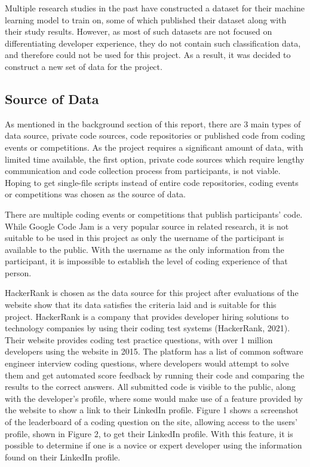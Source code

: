\documentclass{report}
\begin{document}
Multiple research studies in the past have constructed a dataset for their machine learning model to train on, some of which published their dataset along with their study results. However, as most of such datasets are not focused on differentiating developer experience, they do not contain such classification data, and therefore could not be used for this project. As a result, it was decided to construct a new set of data for the project.

\subsection{Source of Data}

As mentioned in the background section of this report, there are 3 main types of data source, private code sources, code repositories or published code from coding events or competitions. As the project requires a significant amount of data, with limited time available, the first option, private code sources which require lengthy communication and code collection process from participants, is not viable. Hoping to get single-file scripts instead of entire code repositories, coding events or competitions was chosen as the source of data.

There are multiple coding events or competitions that publish participants’ code. While Google Code Jam is a very popular source in related research, it is not suitable to be used in this project as only the username of the participant is available to the public. With the username as the only information from the participant, it is impossible to establish the level of coding experience of that person.

HackerRank is chosen as the data source for this project after evaluations of the website show that its data satisfies the criteria laid and is suitable for this project. HackerRank is a company that provides developer hiring solutions to technology companies by using their coding test systems (HackerRank, 2021). Their website provides coding test practice questions, with over 1 million developers using the website in 2015. The platform has a list of common software engineer interview coding questions, where developers would attempt to solve them and get automated score feedback by running their code and comparing the results to the correct answers. All submitted code is visible to the public, along with the developer’s profile, where some would make use of a feature provided by the website to show a link to their LinkedIn profile. Figure 1 shows a screenshot of the leaderboard of a coding question on the site, allowing access to the users’ profile, shown in Figure 2, to get their LinkedIn profile. With this feature, it is possible to determine if one is a novice or expert developer using the information found on their LinkedIn profile.
\end{document}
